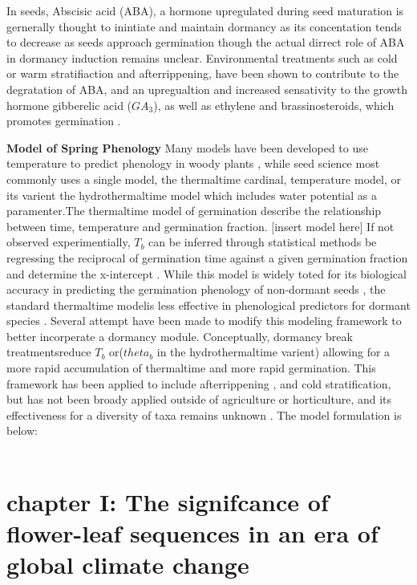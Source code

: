 \documentclass{article}\usepackage[]{graphicx}\usepackage[]{color}
\begin{document}
{\par In seeds, Abscisic acid (ABA), a hormone upregulated during seed maturation is gernerally thought to inintiate and maintain dormancy as its concentation tends to decrease as seeds approach germination  though the actual dirrect role of ABA in dormancy induction remains unclear. Environmental treatments such as cold or warm stratifiaction and afterrippening, have been shown to contribute to the degratation of ABA, and an upregualtion and increased sensativity to the growth hormone gibberelic acid ($GA_3$), as well as ethylene and brassinosteroids, which promotes germination \citep{Kucera2005}.

\textbf{Model of Spring Phenology}
Many models have been developed to use temperature to predict phenology in woody plants \citep{Chuine2002}, while seed science most commonly uses a single model, the thermaltime cardinal, temperature model, or its varient the hydrothermaltime model which includes water potential as a paramenter\citep{Bradford2002}.The thermaltime model of germination describe the relationship between time, temperature and germination fraction.
[insert model here]
If not observed experimentially, $T_b$ can be inferred through statistical methods be regressing the reciprocal of germination time against a given germination fraction and determine the x-intercept \citep{Pritchard1999}.
While this model is widely toted for its biological accuracy in predicting the germination phenology of non-dormant seeds \citep{Bradford2005}, the standard thermaltime modelis less effective in phenological predictors for dormant species \citep{Batlla2015}.
Several attempt have been made to modify this modeling framework to better incorperate a dormancy module. Conceptually, dormancy break treatmentsreduce $T_b$ or($theta_b$ in the hydrothermaltime varient) allowing for a more rapid accumulation of thermaltime and more rapid germination. This framework has been applied to include afterrippening \citep{Meyer2000}, and cold stratification\citep{Pritchard1996,Batlla2003}, but has not been broady applied outside of agriculture or horticulture, and its effectiveness for a diversity of taxa remains unknown \citep{Steadman2004}. The model formulation is below:\\
[insert second model here]\\

\section*{chapter I: The signifcance of flower-leaf sequences in an era of global climate change}
}
\end{document}
